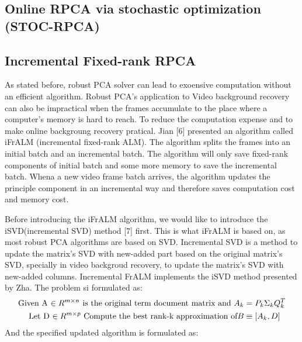 \documentclass[oneside]{article}
\begin{document}
\subsection{Online RPCA via stochastic optimization (STOC-RPCA)}
\subsection{Incremental Fixed-rank RPCA}
As stated before, robust PCA solver can lead to exoensive computation without an efficient algorithm. Robust PCA's application to Video background recovery can also be impractical when the frames accumulate to the place where a computer's memory is hard to reach. To reduce the computation expense and to make online backgroung recovery pratical. Jian [6] presented an algorithm called iFrALM (incremental fixed-rank ALM). The algorithm splits the frames into an initial batch and an incremental batch. The algorithm will only save fixed-rank components of initial batch and some more memory to save the incremental batch. Whena a new video frame batch arrives, the algorithm updates the principle component in an incremental way and therefore saves computation cost and memory cost.

Before introducing the iFrALM algorithm, we would like to introduce the iSVD(incremental SVD) method [7] first. This is what iFrALM is based on, as most robust PCA algorithms are based on SVD. Incremental SVD is a method to update the matrix's SVD with new-added part based on the original matrix's SVD, specially in video backgroud recovery, to update the matrix's SVD with new-added columns. Incremental FrALM implements the iSVD method presented by Zha. The problem si formulated as:
\begin{align*}
\text{Given A $ \in R^{m \times n}$ is the original term document matrix and } A_k &= P_k \Sigma_k Q_k^T \\ \text{Let D $\in R^{m \times p}$ Compute the best rank-k approximation of} B &\equiv [A_k, D]
\end{align*}
And the specified updated algorithm is formulated as:
\end{document}
